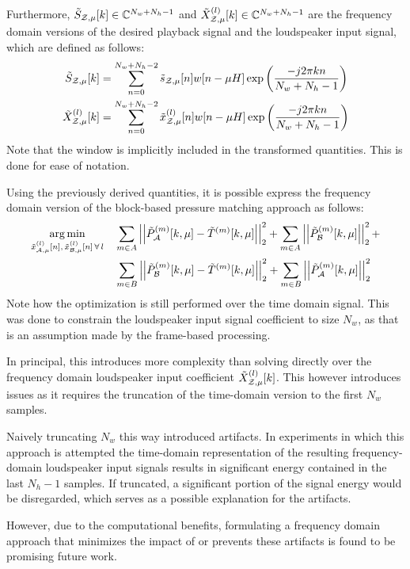 Furthermore, $\tilde{S}_{\mathcal{Z},\mu}[k]\in\mathbb{C}^{N_w + N_h - 1}$ and 
$\tilde{X}^{(l)}_{\mathcal{Z},\mu}[k]\in\mathbb{C}^{N_w + N_h - 1}$ are the frequency domain versions of
the desired playback signal and the loudspeaker input signal, which are defined as follows:
\begin{align}
    \tilde{S}_{\mathcal{Z},\mu}[k] &= \sum_{n=0}^{N_w + N_h - 2} \tilde{s}_{\mathcal{Z},\mu}[n]w[n - \mu H]
        \exp\left(\frac{-j2\pi k n}{N_w + N_h - 1}\right) \\
    \tilde{X}^{(l)}_{\mathcal{Z},\mu}[k] &= \sum_{n=0}^{N_w + N_h - 2} \tilde{x}^{(l)}_{\mathcal{Z},\mu}[n]w[n - \mu H]
        \exp\left(\frac{-j2\pi k n}{N_w + N_h - 1}\right)
\end{align}
Note that the window is implicitly included in the transformed quantities.
This is done for ease of notation.

Using the previously derived quantities, it is possible express the frequency domain version of the block-based pressure matching approach
as follows:
\begin{align}
    \argmin{\tilde{x}_{\za,\mu}^{(l)}[n],\,\tilde{x}_{\zb,\mu}^{(l)}[n]\,\forall\,l}{
       &\sum_{m\in A} \norm[2][2]{\tilde{P}_{\za}^{(m)}[k,\mu] - \tilde{T}^{(m)}[k,\mu]} +
        \sum_{m\in A} \norm[2][2]{\tilde{P}_{\zb}^{(m)}[k,\mu]} + \\
       &\sum_{m\in B} \norm[2][2]{\tilde{P}_{\zb}^{(m)}[k,\mu] - \tilde{T}^{(m)}[k,\mu]} + 
        \sum_{m\in B} \norm[2][2]{\tilde{P}_{\za}^{(m)}[k,\mu]}
    }
\end{align}
Note how the optimization is still performed over the time domain signal.
This was done to constrain the loudspeaker input signal coefficient to size $N_w$, 
as that is an assumption made by the frame-based processing.

In principal, this introduces more complexity than solving directly over the frequency domain loudspeaker input coefficient
$\tilde{X}^{(l)}_{\mathcal{Z},\mu}[k]$.
This however introduces issues as it requires the truncation of the time-domain version to the first $N_w$ samples.

Naively truncating $N_w$ this way introduced artifacts. 
In experiments in which this approach is attempted the time-domain representation of the resulting frequency-domain loudspeaker input signals 
results in significant energy contained in the last $N_h - 1$ samples.
If truncated, a significant portion of the signal energy would be disregarded, which serves as a possible explanation for the artifacts.

However, due to the computational benefits, formulating a frequency domain approach that minimizes the impact of or prevents these artifacts is 
found to be promising future work.
